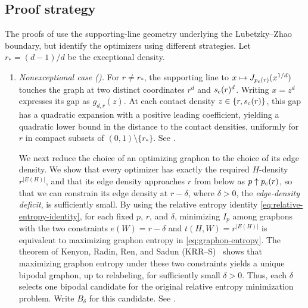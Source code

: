 \subsection{Proof strategy}\label{sec:proof-strategy}
The proofs of 
use the supporting-line geometry underlying the Lubetzky--Zhao boundary,
but identify the optimizers using different strategies.
Let $r_*=(d-1)/d$ be the exceptional density.

\begin{enumerate}[label=(\roman*),leftmargin=2.2em]
\item \emph{Nonexceptional case ().}
For $r\ne r_*$, the supporting line to
$x\mapsto J_{\pc(r)}(x^{1/d})$ touches the graph at
two distinct coordinates $r^d$ and $\sc(r)^d$.
Writing $x=z^d$ expresses its gap as $g_{d,r}(z)$.
At each contact density $z\in\{r,\sc(r)\}$,
this gap has a quadratic expansion with a positive leading coefficient,
yielding a quadratic lower bound in the distance to the contact densities,
uniformly for $r$ in compact subsets of $(0,1)\setminus\{r_*\}$.
See .

We next reduce the choice of an optimizing graphon to the choice of its
edge density.  We show that every optimizer
has exactly the required $H$-density $r^{|E(H)|}$, and that its edge density
approaches $r$ from below as $p\uparrow\pc(r)$, so that we can constrain its
edge density at $r-\delta$, where $\delta>0$, the \emph{edge-density deficit}, is sufficiently small.
By using the relative entropy identity \eqref{eq:relative-entropy-identity},
for each fixed $p$, $r$, and $\delta$, minimizing $I_p$ among graphons with the
two constraints $e(W)=r-\delta$ and $t(H,W)=r^{|E(H)|}$ is equivalent to maximizing
graphon entropy in \eqref{eq:graphon-entropy}.
The theorem of Kenyon, Radin, Ren, and Sadun \mbox{(KRR--S)}~\cite{kenyon2014entropy}
shows that maximizing graphon entropy under these two constraints
yields a unique bipodal graphon, up to relabeling, for sufficiently small $\delta>0$.
Thus, each $\delta$ selects one bipodal candidate for the original relative
entropy minimization problem.  Write $B_\delta$ for this candidate.
See .


\end{enumerate}
